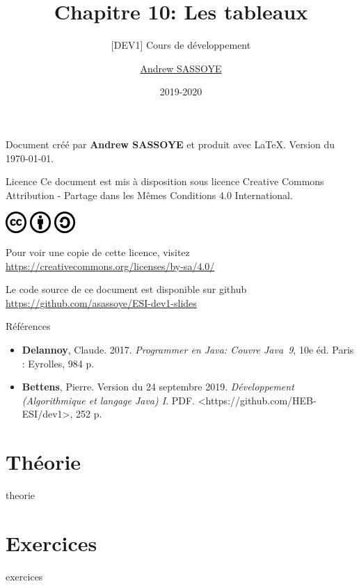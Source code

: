 \documentclass[utf8]{beamer}
\title{Chapitre 10: Les tableaux}
\subtitle{\tiny [DEV1] Cours de développement}
\author{\href{https://andrew.sassoye.be}{Andrew SASSOYE}}
\date{2019-2020}
\begin{document}
    \begin{frame}
        \titlepage
    \end{frame}

    \begin{frame}
        \center Document créé par \textbf{Andrew SASSOYE} et produit avec \LaTeX.
        \tiny Version du \today. \normalsize

        \begin{block}{Licence}
            Ce document est mis à disposition sous licence Creative Commons
            Attribution - Partage dans les Mêmes Conditions 4.0 International.

            \begin{center}
                \includegraphics[width=8mm]{./styles/images/cc}
                \includegraphics[width=8mm]{./styles/images/by}
                \includegraphics[width=8mm]{./styles/images/sa}
            \end{center}

            \center\tiny Pour voir une copie de cette licence, visitez
            \href{https://creativecommons.org/licenses/by-sa/4.0/}{https://creativecommons.org/licenses/by-sa/4.0/}
            \normalsize
        \end{block}

        \tiny Le code source de ce document est disponible sur github\\ \href{https://github.com/asassoye/ESI-dev1-slides}{https://github.com/asassoye/ESI-dev1-slides}

    \end{frame}

    \begin{frame}{Références}
        \begin{itemize}
            \item \textbf{Delannoy}, Claude. 2017. \textit{Programmer en Java: Couvre Java~9}, 10e éd. Paris : Eyrolles, 984 p.
            \item \textbf{Bettens}, Pierre. Version du 24 septembre 2019. \textit{Développement (Algorithmique et langage Java) I}. PDF. <https://github.com/HEB-ESI/dev1>, 252 p.
        \end{itemize}
    \end{frame}

    \part{Théorie}
        {theorie}

    \part{Exercices}
        {exercices}
\end{document}
